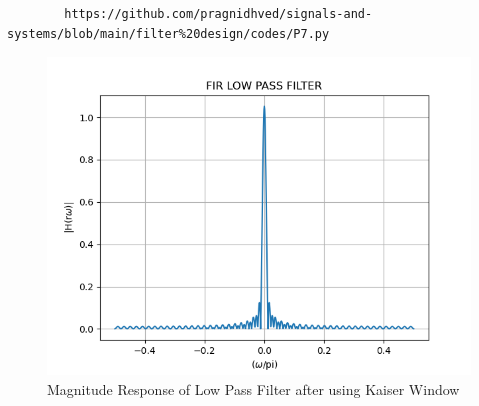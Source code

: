 \documentclass{article}
\begin{document}
	\begin{lstlisting}
		https://github.com/pragnidhved/signals-and-systems/blob/main/filter%20design/codes/P7.py
	\end{lstlisting}
	\newpage
	\begin{figure}[htbp]
		\centering
		\includegraphics[width=1\linewidth]{figs/fig7}
		\caption{Magnitude Response of Low Pass Filter after using Kaiser Window}
		\label{fig:Kaiser_LPF_response}
	\end{figure}
\end{document}

